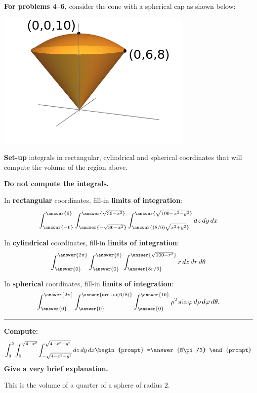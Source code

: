 \documentclass{ximera}
\begin{document}
\textbf{For problems 4--6,} consider the cone with a spherical cap
as shown below:
\begin{image}
  \includegraphics{coneWithCap6-8-10.png}
\end{image}

\textbf{Set-up} integrals in rectangular, cylindrical and spherical
coordinates that will compute the volume of the region above.

\textbf{Do not compute the integrals.}
\vfill

\begin{problem}
  In \textbf{rectangular} coordinates, fill-in \textbf{limits of integration}:
  \[
  \int_{\answer{-6}}^{\answer{6}}
  \int_{\answer{-\sqrt{36-x^2}}}^{\answer{\sqrt{36-x^2}}}
  \int_{\answer{(8/6)\sqrt{x^2+y^2}}}^{\answer{\sqrt{100-x^2-y^2}}}
  \d z \d y \d x
  \]
\end{problem}

\vfill

\begin{problem}
  In \textbf{cylindrical} coordinates, fill-in \textbf{limits of integration}:
  \[
  \int_{\answer{0}}^{\answer{2\pi}}
  \int_{\answer{0}}^{\answer{6}}
  \int_{\answer{8r/6}}^{\answer{\sqrt{100-r^2}}}
  r \d z \d r \d \theta
  \]
\end{problem}


\vfill

\begin{problem}
  In \textbf{spherical} coordinates, fill-in \textbf{limits of integration}:
  \[
  \int_{\answer{0}}^{\answer{2\pi}}
  \int_{\answer{0}}^{\answer{\arctan(6/8)}}
  \int_{\answer{0}}^{\answer{10}}
  \rho^2 \sin \varphi \d \rho \d \varphi \d\theta.
  \]
\end{problem}

\vfill

\hrule

\begin{problem}
  \textbf{Compute:}
  \[
  \int_{0}^{2} \int_{0}^{\sqrt{4-x^2}}\int_{-\sqrt{4-x^2-y^2}}^{\sqrt{4-x^2-y^2}} \d z\d y \d x
  \begin{prompt}
  =\answer{8\pi/3}  
  \end{prompt}
  \]
  \textbf{Give a very brief explanation.}
  \begin{feedback}[correct]
    This is the volume of a quarter of a sphere of radius $2$.
  \end{feedback}
  \vfill
\end{problem}
\end{document}
